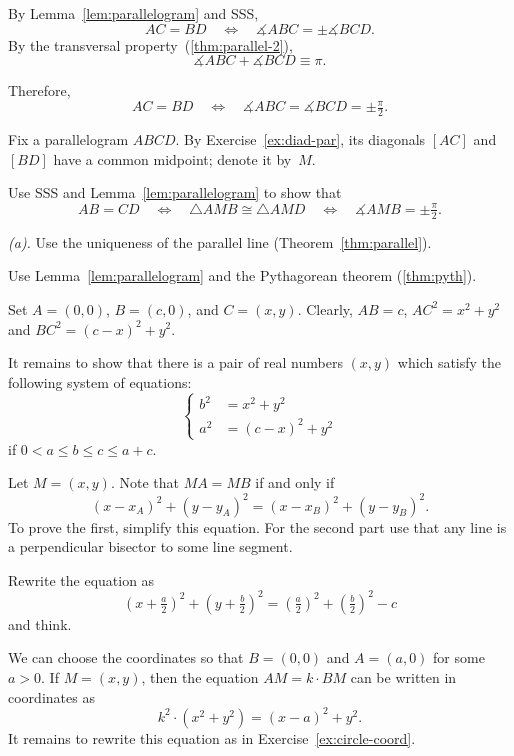 By Lemma~\ref{lem:parallelogram} and SSS, 
\[AC=BD
\quad
\iff
\quad
\measuredangle ABC=\pm \measuredangle BCD.\]
By the transversal property~(\ref{thm:parallel-2}), 
\[\measuredangle ABC+\measuredangle BCD\equiv \pi.\]

Therefore, 
\[AC=BD
\quad
\iff
\quad 
\measuredangle ABC
=\measuredangle BCD
=\pm\tfrac\pi2.\]

Fix a parallelogram $ABCD$.
By Exercise~\ref{ex:diad-par},
its diagonals $[AC]$ and $[BD]$ have a common midpoint; denote it by~$M$.

Use SSS and Lemma~\ref{lem:parallelogram} to show that
\[AB=CD
\quad
\iff
\quad
\triangle AMB
\cong
\triangle AMD
\quad
\iff
\quad
\measuredangle AMB
=
\pm\tfrac\pi2.\]

 \textit{(a).} Use the uniqueness of the parallel line (Theorem~\ref{thm:parallel}).

 Use Lemma~\ref{lem:parallelogram} and the Pythagorean theorem (\ref{thm:pyth}).

Set $A=(0,0)$, $B=(c,0)$, and $C=(x,y)$.
Clearly, $AB=c$,
$AC^2=x^2+y^2$ and $BC^2=(c-x)^2+y^2$.

It remains to show that there is a pair of real numbers $(x,y)$ 
which satisfy the following system of equations:
$$
\left\{
\begin{aligned}
b^2&=x^2+y^2
\\
a^2&=(c-x)^2+y^2
\end{aligned}
\right.
$$
if $0<a\le b\le c\le a+c$.




 Let $M=(x,y)$. Note that $MA=MB$ if and only if
\[(x-x_A)^2+(y-y_A)^2=(x-x_B)^2+(y-y_B)^2.\]
To prove the first, simplify this equation.
For the second part use that any line is a perpendicular bisector to some line segment.

 Rewrite the equation as 
\[(x+\tfrac a2)^2+(y+\tfrac b2)^2=(\tfrac a2)^2+(\tfrac b2)^2-c\]
and think.

We can choose the coordinates so that $B=(0,0)$ and $A=(a,0)$ for some $a>0$.
If $M=(x,y)$, then the equation $AM=k\cdot BM$ can be written in coordinates as 
\[k^2\cdot(x^2+y^2)=(x-a)^2+y^2.\]
It remains to rewrite this equation as in Exercise~\ref{ex:circle-coord}.


